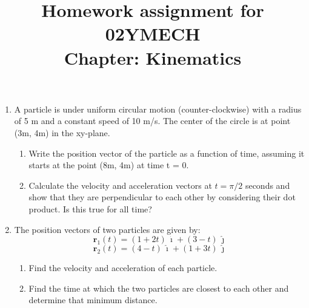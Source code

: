 \documentclass[12pt]{article}
\title{Homework assignment for 02YMECH \\ Chapter: Kinematics}
\begin{document}
\date{}
\maketitle
\vspace{-0.8in}
\begin{enumerate}
    \item A particle is under uniform circular motion (counter-clockwise) with a radius of 5 m and a constant speed of 10 m/s. The center of the circle is at point (3m, 4m) in the xy-plane. 
    \begin{enumerate}
      \item Write the position vector of the particle as a function of time, assuming it starts at the point (8m, 4m) at time t = 0.
      \item Calculate the velocity and acceleration vectors at $t=\pi/2$ seconds and show that they are perpendicular to each other by considering their dot product. Is this true for all time?
    \end{enumerate}


    \item The position vectors of two particles are given by:
    \[\mathbf{r}_1(t) = (1 + 2t)\,\hat{\imath} + (3 - t)\,\hat{\jmath}\]
    \[\mathbf{r}_2(t) = (4 - t)\,\hat{\imath} + (1 + 3t)\,\hat{\jmath}\]
    \begin{enumerate}
        \item Find the velocity and acceleration of each particle.
        \item Find the time at which the two particles are closest to each other and determine that minimum distance.
    \end{enumerate}


 
          
\end{enumerate}
\end{document}
